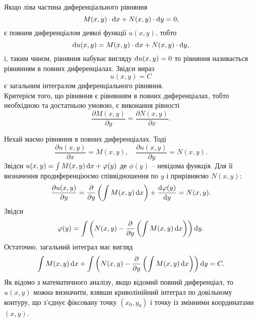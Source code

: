 Якщо ліва частина диференціального рівняння
\begin{equation*}
	M(x, y) \cdot \mathop{}\!\mathrm{d} x + N(x, y) \cdot \mathop{}\!\mathrm{d} y = 0,
\end{equation*}
є повним диференціалом деякої функції $u(x, y)$, тобто
\begin{equation*}
	\mathop{}\!\mathrm{d} u(x, y) = M(x, y) \cdot \mathop{}\!\mathrm{d} x + N(x, y) \cdot \mathop{}\!\mathrm{d} y,
\end{equation*}
і, таким чином, рівняння набуває вигляду $\mathop{}\!\mathrm{d} u (x, y) = 0$ то рівняння називається рівнянням в повних диференціалах. Звідси вираз
\begin{equation*}
	u(x, y) = C
\end{equation*}
є загальним інтегралом диференціального рівняння. \\

Критерієм того, що рівняння є рівнянням в повних диференціалах, тобто необхідною та достатньою умовою, є виконання рівності
\begin{equation*}
	\frac{\partial M(x, y)}{\partial y} = \frac{\partial N(x, y)}{\partial x}.
\end{equation*}
 
Нехай маємо рівняння в повних диференціалах. Тоді
\begin{equation*}
	\frac{\partial u(x, y)}{\partial x} = M(x, y), \quad \frac{\partial u(x, y)}{\partial y} = N(x, y).
\end{equation*}
Звідси $u(x, y) = \int M(x, y) \mathop{}\!\mathrm{d} x + \varphi(y)$ де $\phi(y)$ -- невідома функція. Для її визначення продиференціюємо співвідношення по $y$ і прирівняємо $N(x, y)$:
\begin{equation*}
	\frac{\partial u(x, y)}{\partial y} = \frac{\partial}{\partial y} \left( \int M(x, y) \mathop{}\!\mathrm{d} x \right) + \frac{\mathop{}\!\mathrm{d} \varphi(y)}{\mathop{}\!\mathrm{d} y} = N(x, y).
\end{equation*}
Звідси
\begin{equation*}
	\varphi(y) = \int \left( N(x, y) - \frac{\partial}{\partial y} \left( \int M(x, y) \mathop{}\!\mathrm{d} x \right) \right) \mathop{}\!\mathrm{d} y.
\end{equation*}
Остаточно, загальний інтеграл має вигляд
\begin{equation*}
	\int M(x, y) \mathop{}\!\mathrm{d} x + \int \left( N(x, y) - \frac{\partial}{\partial y} \left( \int M(x, y) \mathop{}\!\mathrm{d} x \right) \right) \mathop{}\!\mathrm{d} y = C.
\end{equation*}
Як відомо з математичного аналізу, якщо відомий повний диференціал, то $u(x, y)$ можна визначити, взявши криволінійний інтеграл по довільному контуру, що з’єднує фіксовану точку $(x_0, y_0)$ і точку із змінними координатами $(x, y)$. \\

